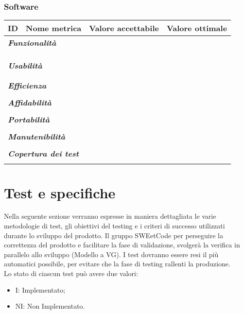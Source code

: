 \documentclass[10pt, a4paper]{article}
\begin{document}
\subsubsection{Software}
    {\renewcommand{\arraystretch}{1.5}
    \begin{tabularx}{\textwidth}{p{}|p{}|X|X}
    \textbf{ID} & \textbf{Nome metrica} & \textbf{Valore accettabile} & \textbf{Valore ottimale}  \\
    \hline
    \multicolumn{4}{l}{\cellcolor{primarycolor}\textbf{\textit{Funzionalità}}} \\
    \hline
     &  &  &  \\
    \hline
     &  &  &  \\
    \hline
     &  &  &  \\
    \hline
    \multicolumn{4}{l}{\cellcolor{primarycolor}\textbf{\textit{Usabilità}}} \\
    \hline
     &  &  &  \\
    \hline
     &  &  &  \\
    \multicolumn{4}{l}{\cellcolor{primarycolor}\textbf{\textit{Efficienza}}} \\
    \hline
     &  &  &  \\
    \hline
    \multicolumn{4}{l}{\cellcolor{primarycolor}\textbf{\textit{Affidabilità}}} \\
    \hline
     &  &  &  \\
    \hline
    \multicolumn{4}{l}{\cellcolor{primarycolor}\textbf{\textit{Portabilità}}} \\
    \hline
     &  &  &  \\
    \hline
    \multicolumn{4}{l}{\cellcolor{primarycolor}\textbf{\textit{Manutenibilità}}} \\
    \hline
     &  &  &  \\
    \hline
    \multicolumn{4}{l}{\cellcolor{primarycolor}\textbf{\textit{Copertura dei test}}} \\
    \hline
     &  &  &  \\
    \end{tabularx}}

\newpage
\section{Test e specifiche}
Nella seguente sezione verranno espresse in maniera dettagliata le varie metodologie di test, gli 
obiettivi del testing e i criteri di successo utilizzati durante lo sviluppo del prodotto.
Il gruppo SWEetCode per perseguire la correttezza del prodotto e facilitare la fase di validazione, svolgerà la verifica in parallelo allo sviluppo (Modello a VG).
I test dovranno essere resi il più automatici possibile, per evitare che la fase di testing rallenti la produzione.\\
Lo stato di ciascun test può avere due valori:
\begin{itemize}
\item I: Implementato;
\item NI: Non Implementato.
\end{itemize}
\end{document}
